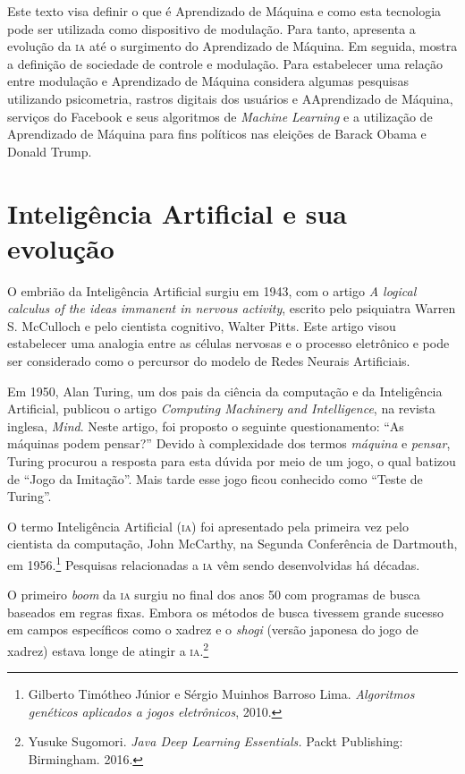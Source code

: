 Este texto visa definir o que é Aprendizado de Máquina e como esta
tecnologia pode ser utilizada como dispositivo de modulação. Para tanto,
apresenta a evolução da \textsc{ia} até o surgimento do Aprendizado de Máquina.
Em seguida, mostra a definição de sociedade de controle e modulação.
Para estabelecer uma relação entre modulação e Aprendizado de Máquina
considera algumas pesquisas utilizando psicometria, rastros digitais dos
usuários e AAprendizado de Máquina, serviços do Facebook e seus
algoritmos de \textit{Machine Learning} e a utilização de Aprendizado de Máquina 
para fins políticos nas eleições de Barack Obama e Donald Trump.

\section{Inteligência Artificial e sua evolução}

O embrião da Inteligência Artificial surgiu em 1943, com o artigo
\textit{A logical calculus of the ideas immanent in nervous activity},
escrito pelo psiquiatra Warren S. McCulloch e
pelo cientista cognitivo, Walter Pitts. Este artigo visou estabelecer
uma analogia entre as células nervosas e o processo eletrônico e pode ser considerado como o percursor do modelo de Redes Neurais Artificiais.

Em 1950, Alan Turing, um dos pais da ciência da computação e da
Inteligência Artificial, publicou o artigo \textit{Computing Machinery
and Intelligence}, na revista inglesa, \textit{Mind}.
Neste artigo, foi proposto o seguinte questionamento: ``As máquinas
podem pensar?'' Devido à complexidade dos termos \textit{máquina} e
\textit{pensar}, Turing procurou a resposta para esta dúvida por meio de um
jogo, o qual batizou de ``Jogo da Imitação''. Mais tarde
esse jogo ficou conhecido como ``Teste de Turing''.

O termo Inteligência Artificial (\textsc{ia}) foi apresentado pela primeira vez
pelo cientista da computação, John McCarthy, na Segunda Conferência de
Dartmouth, em 1956.\footnote{Gilberto Timótheo Júnior e Sérgio Muinhos Barroso Lima. \textit{Algoritmos genéticos aplicados a jogos eletrônicos}, 2010.} Pesquisas relacionadas a \textsc{ia} vêm sendo desenvolvidas há décadas.

O primeiro \textit{boom} da \textsc{ia} surgiu no final dos anos 50 com programas
de busca baseados em regras fixas. Embora os métodos de busca tivessem
grande sucesso em campos específicos como o xadrez e o \textit{shogi} (versão
japonesa do jogo de xadrez) estava longe de atingir a \textsc{ia}.\footnote{Yusuke Sugomori. \textit{Java Deep Learning Essentials.} Packt
Publishing: Birmingham. 2016.}

